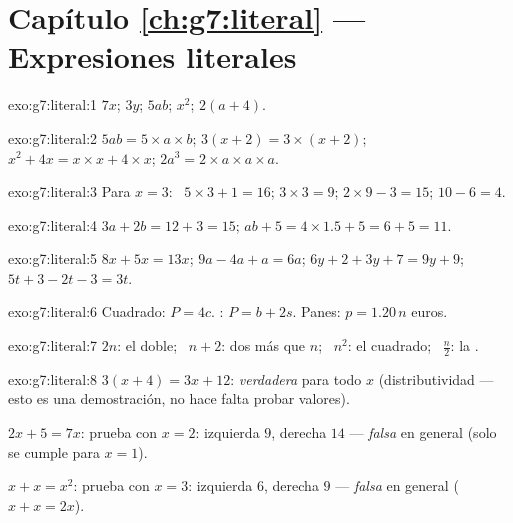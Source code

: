\section*{Capítulo \ref{ch:g7:literal} --- Expresiones literales}

\begin{solution}{exo:g7:literal:1}
$7x$; \quad $3y$; \quad $5ab$; \quad $x^2$; \quad $2(a + 4)$.
\end{solution}

\begin{solution}{exo:g7:literal:2}
$5ab = 5 \times a \times b$; \quad
$3(x+2) = 3 \times (x + 2)$; \quad
$x^2 + 4x = x \times x + 4 \times x$; \quad
$2a^3 = 2 \times a \times a \times a$.
\end{solution}

\begin{solution}{exo:g7:literal:3}
Para $x = 3$: \ $5 \times 3 + 1 = 16$; \quad $3 \times 3 = 9$; \quad
$2 \times 9 - 3 = 15$; \quad $10 - 6 = 4$.
\end{solution}

\begin{solution}{exo:g7:literal:4}
$3a + 2b = 12 + 3 = 15$; \qquad
$ab + 5 = 4 \times 1.5 + 5 = 6 + 5 = 11$.
\end{solution}

\begin{solution}{exo:g7:literal:5}
$8x + 5x = 13x$; \quad
$9a - 4a + a = 6a$; \quad
$6y + 2 + 3y + 7 = 9y + 9$; \quad
$5t + 3 - 2t - 3 = 3t$.
\end{solution}

\begin{solution}{exo:g7:literal:6}
Cuadrado: $P = 4c$. : $P = b + 2s$. Panes:
$p = 1.20\,n$ euros.
\end{solution}

\begin{solution}{exo:g7:literal:7}
$2n$: el doble; \ $n + 2$: dos más que $n$; \ $n^2$: el cuadrado;
\ $\frac n2$: la .
\end{solution}

\begin{solution}{exo:g7:literal:8}
$3(x+4) = 3x + 12$: \emph{verdadera} para todo $x$ (distributividad ---
esto es una demostración, no hace falta probar valores).

$2x + 5 = 7x$: prueba con $x = 2$: izquierda $9$, derecha $14$ --- \emph{falsa} en
general (solo se cumple para $x = 1$).

$x + x = x^2$: prueba con $x = 3$: izquierda $6$, derecha $9$ --- \emph{falsa} en
general ($x + x = 2x$).
\end{solution}

